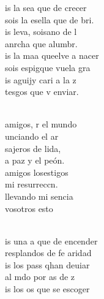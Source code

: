 \begin{cancion}[Id y enseñad][Garabaín]%
	is la sea que de crecer\\
	sois la esella que de bri.\\
	is leva, soisano de l\\
	anrcha que  alumbr.\\
\jump
	is la maa queelve a nacer\\
	sois espigque vuela gra\\
	is aguijy cari a la z\\
	tesgos que v enviar.\\\jump\\
	\begin{chorus}%
	amigos, r el mundo\\
	unciando el ar\\
	sajeros de lida,\\
	a paz y el peón.\\
	amigos losestigos\\
	 mi resurreccn. \\
	llevando mi sencia\\
	vosotros esto\\
	\end{chorus}%
	\jump\\
	is una a que de encender\\
	resplandos de fe aridad\\
	is los pass qhan deuiar\\
	al mdo por as de z\\
\jump
	is los os que se escoger\\

\end{cancion}
